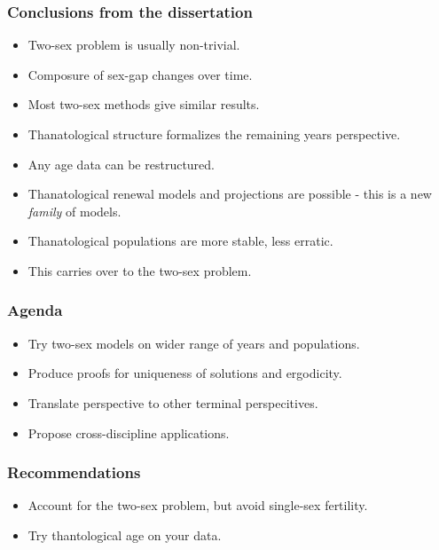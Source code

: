 \documentclass{beamer}
\begin{document}
\begin{frame}
  \frametitle{Conclusions from the dissertation}
  \begin{itemize}
    \item Two-sex problem is usually non-trivial.
    \item Composure of sex-gap changes over time.
    \item Most two-sex methods give similar results.
    \item Thanatological structure formalizes the remaining years perspective.
    \item Any age data can be restructured.
    \item Thanatological renewal models and projections are possible - this is a
    new \textit{family} of models.
    \item Thanatological populations are more stable, less erratic.
    \item This carries over to the two-sex problem.
  \end{itemize}
\end{frame}


\begin{frame}
  \frametitle{Agenda}
  \begin{itemize}
    \item Try two-sex models on wider range of years and populations.
    \item Produce proofs for uniqueness of solutions and ergodicity.
    \item Translate perspective to other terminal perspecitives.
    \item Propose cross-discipline applications.
  \end{itemize}
\end{frame}


\begin{frame}
  \frametitle{Recommendations}
  \begin{itemize}
    \item Account for the two-sex problem, but avoid single-sex fertility.
    \item Try thantological age on your data.
  \end{itemize}
\end{frame}


\begin{frame}[allowframebreaks]
  
\end{frame}

\end{document}
